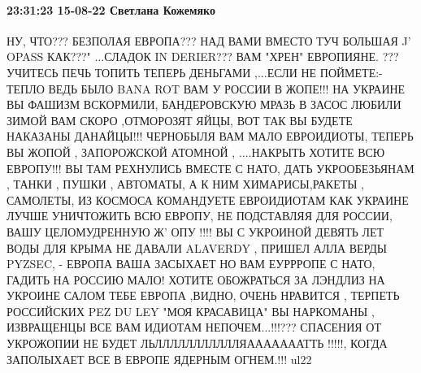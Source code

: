  
 
 
 
 

\paragraph{23:31:23 15-08-22 Светлана Кожемяко}

\obeycr
НУ, ЧТО??? БЕЗПОЛАЯ ЕВРОПА???
НАД ВАМИ ВМЕСТО ТУЧ
БОЛЬШАЯ J' OPASS
КАК???" ...СЛАДОК IN DERIER??? ВАМ "ХРЕН" ЕВРОПИЯНЕ. ???
УЧИТЕСЬ ПЕЧЬ ТОПИТЬ ТЕПЕРЬ
ДЕНЬГАМИ ,...ЕСЛИ НЕ ПОЙМЕТЕ:-
ТЕПЛО ВЕДЬ БЫЛО BANA ROT
ВАМ У РОССИИ В ЖОПЕ!!!
НА УКРАИНЕ ВЫ ФАШИЗМ ВСКОРМИЛИ,
БАНДЕРОВСКУЮ МРАЗЬ В ЗАСОС
ЛЮБИЛИ
ЗИМОЙ ВАМ СКОРО ,ОТМОРОЗЯТ ЯЙЦЫ,
ВОТ ТАК ВЫ БУДЕТЕ НАКАЗАНЫ ДАНАЙЦЫ!!!
ЧЕРНОБЫЛЯ ВАМ МАЛО ЕВРОИДИОТЫ,
ТЕПЕРЬ ВЫ ЖОПОЙ , ЗАПОРОЖСКОЙ АТОМНОЙ ,
....НАКРЫТЬ ХОТИТЕ ВСЮ ЕВРОПУ!!!
ВЫ ТАМ РЕХНУЛИСЬ ВМЕСТЕ С НАТО,
ДАТЬ УКРООБЕЗЬЯНАМ , ТАНКИ , ПУШКИ , АВТОМАТЫ,
А К НИМ ХИМАРИСЫ,РАКЕТЫ , САМОЛЕТЫ,
ИЗ КОСМОСА КОМАНДУЕТЕ ЕВРОИДИОТАМ
КАК УКРАИНЕ ЛУЧШЕ УНИЧТОЖИТЬ
ВСЮ ЕВРОПУ, НЕ ПОДСТАВЛЯЯ ДЛЯ РОССИИ, ВАШУ ЦЕЛОМУДРЕННУЮ
Ж' ОПУ !!!!
ВЫ С УКРОИНОЙ ДЕВЯТЬ ЛЕТ
ВОДЫ ДЛЯ КРЫМА НЕ ДАВАЛИ
ALAVERDY , ПРИШЕЛ АЛЛА ВЕРДЫ
PYZSEC, - ЕВРОПА ВАША ЗАСЫХАЕТ
НО ВАМ ЕУРРРОПЕ С НАТО,
ГАДИТЬ НА РОССИЮ МАЛО!
ХОТИТЕ ОБОЖРАТЬСЯ
ЗА ЛЭНДЛИЗ НА УКРОИНЕ САЛОМ
ТЕБЕ ЕВРОПА ,ВИДНО,
ОЧЕНЬ НРАВИТСЯ ,
ТЕРПЕТЬ РОССИЙСКИХ
PEZ DU LEY
"МОЯ КРАСАВИЦА"
ВЫ НАРКОМАНЫ , ИЗВРАЩЕНЦЫ
ВСЕ ВАМ ИДИОТАМ НЕПОЧЕМ...!!!???
СПАСЕНИЯ ОТ УКРОЖОПИИ НЕ БУДЕТ
ЛЬЛЛЛЛЛЛЛЛЛЛЛЯАААААААТТЬ !!!!!,
КОГДА ЗАПОЛЫХАЕТ ВСЕ В ЕВРОПЕ
ЯДЕРНЫМ ОГНЕМ.!!!
ul22
\restorecr
